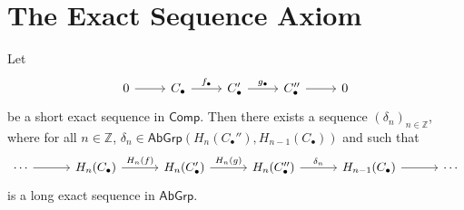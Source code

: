 \section*{The Exact Sequence Axiom}
\begin{proposition}
	\label{prop:les_homology}
	Let
	\begin{equation*}
		\begin{tikzcd}
			0 \arrow[r] & C_\bullet \arrow[r,"f_\bullet"] & C'_\bullet \arrow[r,"g_\bullet"] & C_\bullet'' \arrow[r] & 0
		\end{tikzcd}
	\end{equation*}
	\noindent be a short exact sequence in $\mathsf{Comp}$. Then there exists a sequence $(\delta_n)_{n \in \mathbb{Z}}$, where for all $n \in \mathbb{Z}$, $\delta_n \in \mathsf{AbGrp}(H_n(C_\bullet''),H_{n - 1}(C_\bullet))$ and such that
	\begin{equation*}
		\begin{tikzcd}[column sep=7ex]
			\cdots \arrow[r] & H_n(C_\bullet) \arrow[r,"H_n(f)"] & H_n(C'_\bullet) \arrow[r,"H_n(g)"] & H_n(C''_\bullet) \arrow[r,"\delta_n"] & H_{n - 1}(C_\bullet) \arrow[r] & \cdots
		\end{tikzcd} 
	\end{equation*}
	\noindent is a long exact sequence in $\mathsf{AbGrp}$.
\end{proposition}

